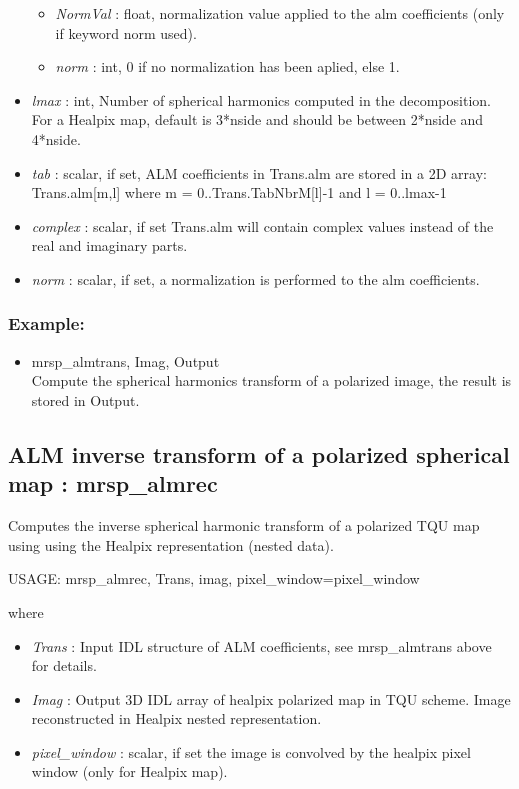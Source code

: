 \begin{itemize}
\begin{itemize}
\item {\em NormVal} : float, normalization value applied to the alm coefficients (only if keyword norm used).
\item {\em norm} : int, 0 if no normalization has been aplied, else 1.
\end{itemize}
\item {\em lmax} : int, Number of spherical harmonics computed in the decomposition. For a Healpix map, default is 
3*nside and should be between 2*nside and 4*nside.
\item {\em tab} : scalar, if set, ALM coefficients in Trans.alm are stored in a 2D array: Trans.alm[m,l] where m = 0..Trans.TabNbrM[l]-1  and l = 0..lmax-1
\item {\em complex} : scalar, if set Trans.alm will contain complex values instead of the real and imaginary parts.
\item {\em norm} : scalar, if set, a normalization is performed to the alm coefficients.
\end{itemize}

\subsubsection*{Example:} 
\begin{itemize}
\item mrsp\_almtrans, Imag, Output \\
Compute the spherical harmonics transform of a polarized image, the result is stored in Output.
\end{itemize}



\subsection{ALM inverse transform of a polarized spherical map : mrsp\_almrec}
Computes the inverse spherical harmonic transform of a polarized TQU map using using the Healpix representation (nested data).
{\bf
\begin{center}
     USAGE: mrsp\_almrec, Trans, imag, pixel\_window=pixel\_window
\end{center}}
where
\begin{itemize}
\item {\em Trans} : Input IDL structure of ALM coefficients, see mrsp\_almtrans above for details.
\item {\em Imag} : Output 3D IDL array of healpix polarized map in TQU scheme. Image reconstructed in Healpix nested representation.
\item {\em pixel\_window} : scalar, if set the image is convolved by the healpix pixel window (only for Healpix map).
\end{itemize}


